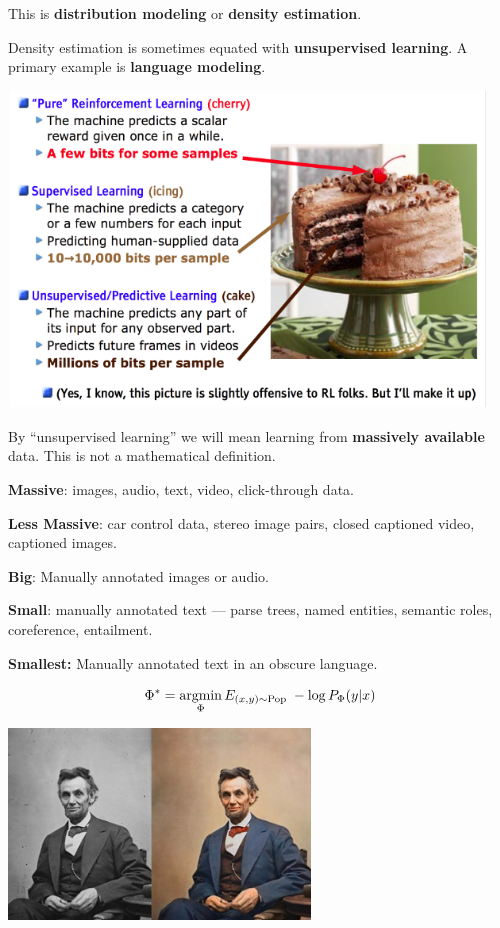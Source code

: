 {{\vfill
This is {\bf distribution modeling} or {\bf density estimation}.

\vfill
Density estimation is sometimes equated with {\bf unsupervised learning}.  A primary example is {\bf language modeling}.


\centerline{\includegraphics[width = 8in]{../images/cake}}



By ``unsupervised learning'' we will mean learning from {\bf massively available} data.  This is not a mathematical definition.

\vfill
{\bf Massive}: images, audio, text, video, click-through data.

\vfill
{\bf Less Massive}: car control data, stereo image pairs, closed captioned video, captioned images.

\vfill
{\bf Big}: Manually annotated images or audio.

\vfill
{\bf Small}: manually annotated text --- parse trees, named entities, semantic roles, coreference, entailment.

\vfill
{\bf Smallest:} Manually annotated text in an obscure language.


$$\Phi^* = \operatorname*{argmin}_\Phi E_{(x,y) \sim \mathrm{Pop}}\;-\log P_\Phi(y|x)$$

\vfill
\centerline{\includegraphics[height=2in]{../images/Colorization}}

}}
